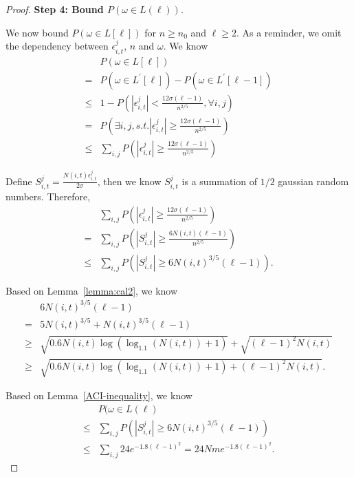 \begin{proof}
\noindent\textbf{Step 4: Bound $P(\omega\in L(\ell))$}.

We now bound $P(\omega\in L[\ell])$ for $n\geq n_0$ and $\ell\geq 2$. As a reminder, we omit the dependency between $\epsilon_{i,t}^{j}$, $n$ and $\omega$. We know 
\begin{align}
&P(\omega\in L[\ell]) \nonumber \\
=&P(\omega\in L^{'}[\ell])- P(\omega\in L^{'}[\ell-1]) \nonumber \\
\leq & 1-P\left(|\epsilon_{i,t}^{j}|<\frac{12\sigma (\ell-1)}{n^{2/5}}, \forall i,j\right) \nonumber \\
=&P\left(\exists i,j, s.t. |\epsilon_{i,t}^{j}|\geq \frac{12\sigma (\ell-1)}{n^{2/5}}\right) \nonumber  \\
\leq &\sum_{i,j}P\left(|\epsilon_{i,t}^{j}|\geq \frac{12\sigma (\ell-1)}{n^{2/5}}\right) \nonumber
\end{align}

Define $S_{i,t}^{j}=\frac{N(i,t)\epsilon_{i,t}^{j}}{2\sigma}$, then we know $S_{i,t}^{j}$ is a summation of $1/2$ gaussian random numbers. Therefore,
\begin{align}
&\sum_{i,j}P\left(|\epsilon_{i,t}^{j}|\geq \frac{12\sigma(\ell-1)}{n^{2/5}}\right) \nonumber \\ 
=&\sum_{i,j}P\left(|S_{i,t}^{j}|\geq \frac{6N(i,t)(\ell-1)}{n^{2/5}}\right) \nonumber \\
\leq &\sum_{i,j}P(|S_{i,t}^{j}|\geq 6N(i,t)^{3/5}(\ell-1)). \nonumber
\end{align}

Based on Lemma~\ref{lemma:cal2}, we know
\begin{align}
&6N(i,t)^{3/5}(\ell-1) \nonumber \\
=& 5N(i,t)^{3/5} + N(i,t)^{3/5}(\ell-1) \nonumber \\
\geq & \sqrt{0.6N(i,t)\log(\log_{1.1}(N(i,t))+1)} + \sqrt{(\ell-1)^2 N(i,t)} \nonumber \\
\geq & \sqrt{0.6N(i,t)\log(\log_{1.1}(N(i,t))+1)+(\ell-1)^2 N(i,t)}. \nonumber
\end{align}

Based on Lemma~\ref{ACI-inequality}, we know
\begin{align}
& P(\omega\in L(\ell) \nonumber \\
\leq &\sum_{i,j}P(|S_{i,t}^{j}|\geq 6N(i,t)^{3/5}(\ell-1)) \nonumber \\
\leq & \sum_{i,j}24e^{-1.8(\ell-1)^2} = 24Nme^{-1.8(\ell-1)^2}. \nonumber
\end{align}


\end{proof}
